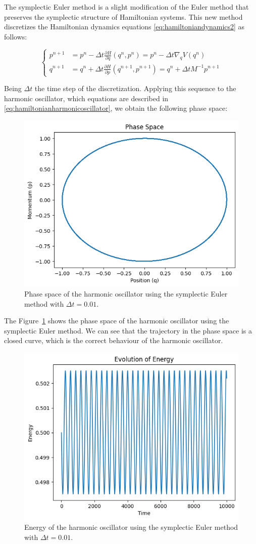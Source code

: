 \documentclass{article}
\begin{document}
The symplectic Euler method is a slight modification of the Euler method that preserves the symplectic structure of Hamiltonian systems. This new method discretizes the Hamiltonian dynamics equations \eqref{eq:hamiltoniandynamics2} as follows:

\begin{equation}
	\begin{cases}
		p^{n+1} &= p^n - \Delta t \frac{\partial H}{\partial q}(q^n, p^n) = p^n - \Delta t \nabla_q V(q^n) \\
		q^{n+1} &= q^n + \Delta t \frac{\partial H}{\partial p}(q^{n+1}, p^{n+1}) = q^n + \Delta t M^{-1} p^{n+1}
	\end{cases}
	\label{eq:symplecticeuler}
\end{equation}

Being \(\Delta t\) the time step of the discretization. Applying this sequence to the harmonic oscillator, which equations are described in \eqref{eq:hamiltonianharmonicoscillator}, we obtain the following phase space:

\begin{figure}[H]
	\centering
	\includegraphics[width=0.5\linewidth]{./Figures/Sympletic/eulerphase.png}
	\caption{Phase space of the harmonic oscillator using the symplectic Euler method with \(\Delta t = 0.01\).}
	\label{fig:eulerphase}
\end{figure}

The Figure~\ref{fig:eulerphase} shows the phase space of the harmonic oscillator using the symplectic Euler method. We can see that the trajectory in the phase space is a closed curve, which is the correct behaviour of the harmonic oscillator.

\begin{figure}[H]
	\centering
	\includegraphics[width=0.5\linewidth]{./Figures/Sympletic/eulerenergy.png}
	\caption{Energy of the harmonic oscillator using the symplectic Euler method with \(\Delta t = 0.01\).}
	\label{fig:eulerenergy}
\end{figure}
\end{document}
